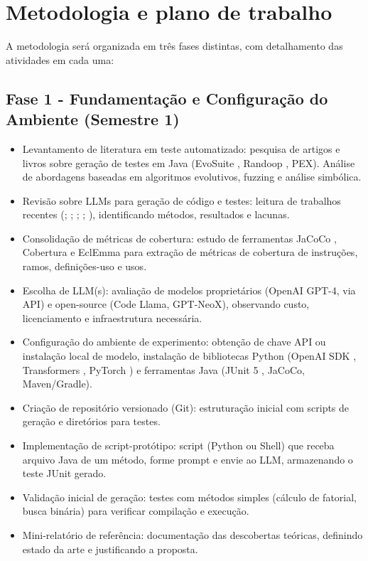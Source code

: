 \section{Metodologia e plano de trabalho}
    A metodologia será organizada em três fases distintas, com detalhamento das atividades em cada uma:

    \subsection{Fase 1 - Fundamentação e Configuração do Ambiente (Semestre 1)}
        \begin{itemize}
            \item Levantamento de literatura em teste automatizado: pesquisa de artigos e livros sobre geração de testes em Java (EvoSuite \cite{fraser2011evosuite}, Randoop \cite{pacheco2007randoop}, PEX). Análise de abordagens baseadas em algoritmos evolutivos, fuzzing e análise simbólica.
            \item Revisão sobre LLMs para geração de código e testes: leitura de trabalhos recentes (\cite{chen2021evaluating}; \cite{chen2023chatunitest}; \cite{moradidakhel2023effective}; \cite{gu2024testART}; \cite{steenhoek2024reinforcement}), identificando métodos, resultados e lacunas.
            \item Consolidação de métricas de cobertura: estudo de ferramentas JaCoCo \cite{jacoco2023}, Cobertura \cite{cobertura2022} e EclEmma \cite{eclemma2023} para extração de métricas de cobertura de instruções, ramos, definições-uso e usos.
            \item Escolha de LLM(s): avaliação de modelos proprietários (OpenAI GPT-4, via API) e open-source (Code Llama, GPT-NeoX), observando custo, licenciamento e infraestrutura necessária.
            \item Configuração do ambiente de experimento: obtenção de chave API ou instalação local de modelo, instalação de bibliotecas Python (OpenAI SDK \cite{junit52023}, Transformers \cite{wolf2020transformers}, PyTorch \cite{paszke2019pytorch}) e ferramentas Java (JUnit 5 \cite{junit52023}, JaCoCo, Maven/Gradle).
            \item Criação de repositório versionado (Git): estruturação inicial com scripts de geração e diretórios para testes.
            \item Implementação de script-protótipo: script (Python ou Shell) que receba arquivo Java de um método, forme prompt e envie ao LLM, armazenando o teste JUnit gerado.
            \item Validação inicial de geração: testes com métodos simples (cálculo de fatorial, busca binária) para verificar compilação e execução.
            \item Mini-relatório de referência: documentação das descobertas teóricas, definindo estado da arte e justificando a proposta.
        \end{itemize}
